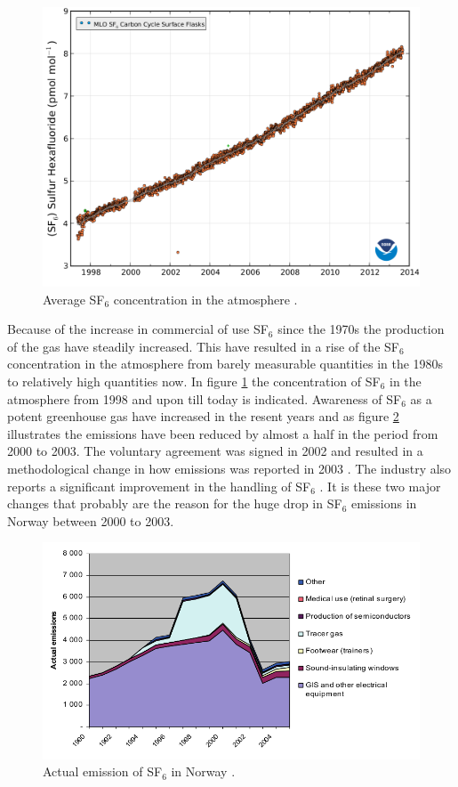 \documentclass[10pt,a4paper]{article} %
\begin{document}
\begin{figure}[H]
\centering
\includegraphics[scale=0.4]{Bilder/Theory/consentrationSF6.png}
\caption{Average SF$_6$ concentration in the atmosphere \cite{bib:consSF6}.} \label{fig:conSF6}
\end{figure}

Because of the increase in commercial of use SF$_6$ since the 1970s the production of the gas have steadily increased. This have resulted in a rise of the SF$_6$ concentration in the atmosphere from barely measurable quantities in the 1980s \cite{bib:SF6PI} to relatively high quantities now. In figure \ref{fig:conSF6} the concentration of SF$_6$ in the atmosphere from 1998 and upon till today is indicated. Awareness of SF$_6$ as a potent greenhouse gas have increased in the resent years and as figure \ref{fig:SF6EmissNor} illustrates the emissions have been reduced by almost a half in the period from 2000 to 2003. The voluntary agreement was signed in 2002 and resulted in a methodological change in how emissions was reported in 2003 \cite{bib:regSF6Miljo}. The industry also reports a significant improvement in the handling of SF$_6$ \cite{bib:StatSF6}. It is these two major changes that probably are the reason for the huge drop in SF$_6$ emissions in Norway between 2000 to 2003. 

\begin{figure}[H]
\centering
\includegraphics[scale=0.6]{Bilder/Theory/emissionsSF6Norway.png}
\caption{Actual emission of SF$_6$ in Norway \cite{bib:StatSF6}.} \label{fig:SF6EmissNor}
\end{figure}
\end{document}
